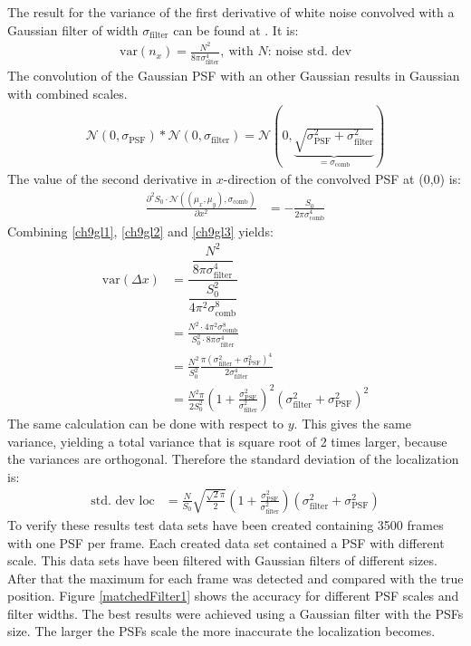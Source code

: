 The result for the variance of the first derivative of white noise convolved with a Gaussian filter of width $\sigma_\text{filter}$ can be found at \cite{ulli}. It is:
\begin{align}
	\text{var}(n_x) = \frac{N^2}{8\pi\sigma_\text{filter}^4},~\text{with }N\text{: noise std. dev} \label{ch9gl2}
\end{align}
The convolution of the Gaussian PSF  with an other Gaussian results in Gaussian with combined scales.
\begin{align}
 \mathcal{N}(0,\sigma_\text{PSF}) \ast \mathcal{N}(0,\sigma_\text{filter}) = \mathcal{N}\left(0,\underbrace{\sqrt{\sigma_\text{PSF}^2+\sigma_\text{filter}^2}}_{=\sigma_\text{comb}}\right)
\end{align}
The value of the second derivative in $x$-direction of the convolved PSF at (0,0) is:
\begin{align}
 \frac{\partial^2 S_0\cdot\mathcal{N}\left((\mu_x,\mu_y),\sigma_\text{comb}\right)}{\partial x^2}  &=  -\frac{S_0}{2\pi \sigma_\text{comb}^4}  \label{ch9gl3}
\end{align}
Combining \ref{ch9gl1}, \ref{ch9gl2} and \ref{ch9gl3} yields:
\begin{align}
\text{var}\left(\Delta x\right) &= \dfrac{\dfrac{N^2}{8\pi\sigma_\text{filter}^4}}{\dfrac{S_0^2}{4\pi^2 \sigma_\text{comb}^8}}\\
&= \frac{N^2\cdot 4\pi^2 \sigma_\text{comb}^8}{S_0^2\cdot8\pi\sigma_\text{filter}^4}\\
&= \frac{N^2}{S_0^2} \frac{\pi \left(\sigma_\text{filter}^2+\sigma_\text{PSF}^2\right)^4}{2\sigma_\text{filter}^4}\\
&= \frac{N^2\pi}{2S_0^2} \left(1+\frac{\sigma_\text{PSF}^2}{\sigma_\text{filter}^2}\right)^2\left(\sigma_\text{filter}^2+\sigma_\text{PSF}^2\right)^2 
\end{align}
The same calculation can be done with respect to $y$. This gives the same variance, yielding a total variance that is square root of 2 times larger, because the variances are orthogonal.
Therefore the standard deviation of the localization is:
\begin{align}
 \text{std. dev loc}&=\frac{N}{S_0}\sqrt{\frac{\sqrt{2}\pi}{2}}
 \left(1+\frac{\sigma_\text{PSF}^2}{\sigma_\text{filter}^2}\right)\left(\sigma_\text{filter}^2+\sigma_\text{PSF}^2\right) 
\end{align}
To verify these results test data sets have been created containing 3500 frames with one PSF per frame. Each created data set contained a PSF with different scale. This data sets have been filtered with Gaussian filters of different sizes. After that the maximum for each frame was detected and compared with the true position. Figure \ref{matchedFilter1} shows the accuracy for different PSF scales and filter widths.\newline
The best results were achieved using a Gaussian filter with the PSFs size. The larger the PSFs scale the more inaccurate the localization becomes.\newline

